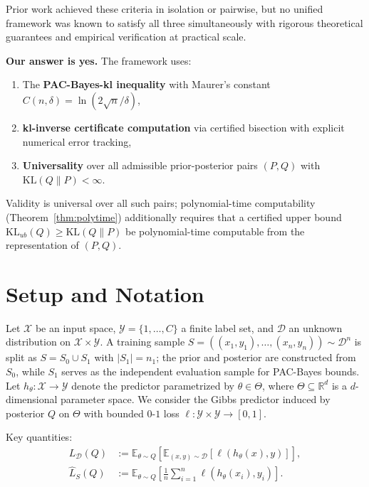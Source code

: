 \documentclass[11pt,a4paper]{article}
\newcommand{\KL}{\mathrm{KL}}
\newcommand{\cD}{\mathcal{D}}
\newcommand{\cX}{\mathcal{X}}
\newcommand{\cY}{\mathcal{Y}}
\newcommand{\R}{\mathbb{R}}
\newcommand{\E}{\mathbb{E}}
\begin{document}
\medskip

\noindent Prior work achieved these criteria in isolation or pairwise, but no unified framework was known to satisfy all three simultaneously with rigorous theoretical guarantees and empirical verification at practical scale.

\textbf{Our answer is yes.} The framework uses:
\begin{enumerate}
    \item The \textbf{PAC-Bayes-kl inequality} with Maurer's constant $C(n,\delta) = \ln(2\sqrt{n}/\delta)$,
    \item \textbf{kl-inverse certificate computation} via certified bisection with explicit numerical error tracking,
    \item \textbf{Universality} over all admissible prior-posterior pairs $(P,Q)$ with $\KL(Q\|P) < \infty$.
\end{enumerate}
Validity is universal over all such pairs; polynomial-time computability (Theorem~\ref{thm:polytime}) additionally requires that a certified upper bound $\KL_{ub}(Q) \ge \KL(Q\|P)$ be polynomial-time computable from the representation of $(P,Q)$.

\section{Setup and Notation}
\label{sec:setup}

Let $\cX$ be an input space, $\cY = \{1, \dots, C\}$ a finite label set, and $\cD$ an unknown distribution on $\cX \times \cY$. A training sample $S = ((x_1, y_1), \dots, (x_n, y_n)) \sim \cD^n$ is split as $S = S_0 \cup S_1$ with $|S_1| = n_1$; the prior and posterior are constructed from $S_0$, while $S_1$ serves as the independent evaluation sample for PAC-Bayes bounds. Let $h_\theta : \cX \to \cY$ denote the predictor parametrized by $\theta \in \Theta$, where $\Theta \subseteq \R^d$ is a $d$-dimensional parameter space. We consider the Gibbs predictor induced by posterior $Q$ on $\Theta$ with bounded $0$-$1$ loss $\ell: \cY \times \cY \to [0,1]$.

Key quantities:
\begin{align}
L_\cD(Q) &:= \E_{\theta \sim Q}[\E_{(x,y) \sim \cD}[\ell(h_\theta(x), y)]], \\
\hat{L}_S(Q) &:= \E_{\theta \sim Q}\!\left[\frac{1}{n}\sum_{i=1}^n \ell(h_\theta(x_i), y_i)\right].
\end{align}
\end{document}
